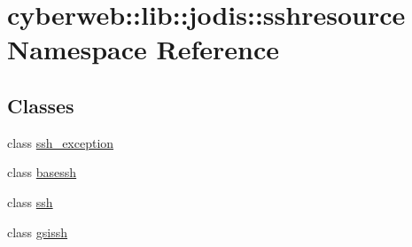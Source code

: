 \hypertarget{namespacecyberweb_1_1lib_1_1jodis_1_1sshresource}{\section{cyberweb\-:\-:lib\-:\-:jodis\-:\-:sshresource \-Namespace \-Reference}
\label{namespacecyberweb_1_1lib_1_1jodis_1_1sshresource}
}
\subsection*{\-Classes}
\begin{DoxyCompactItemize}
\item 
class \hyperlink{classcyberweb_1_1lib_1_1jodis_1_1sshresource_1_1ssh__exception}{ssh\-\_\-exception}
\item 
class \hyperlink{classcyberweb_1_1lib_1_1jodis_1_1sshresource_1_1basessh}{basessh}
\item 
class \hyperlink{classcyberweb_1_1lib_1_1jodis_1_1sshresource_1_1ssh}{ssh}
\item 
class \hyperlink{classcyberweb_1_1lib_1_1jodis_1_1sshresource_1_1gsissh}{gsissh}
\end{DoxyCompactItemize}
